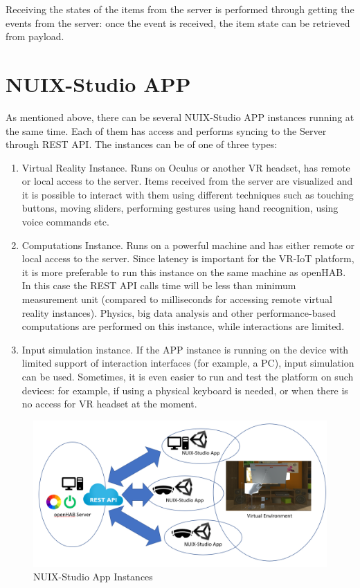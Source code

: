 Receiving the states of the items from the server is performed through getting the events from the server: once the event is received, the item state can be retrieved from payload.

\section{NUIX-Studio APP}

As mentioned above, there can be several NUIX-Studio APP instances running at the same time. Each of them has access and performs syncing to the Server through REST API. The instances can be of one of three types:

\begin{enumerate}
    \item Virtual Reality Instance. Runs on Oculus or another VR headset, has remote or local access to the server. Items received from the server are visualized and it is possible to interact with them using different techniques such as touching buttons, moving sliders, performing gestures using hand recognition, using voice commands etc. 
    \item Computations Instance. Runs on a powerful machine and has either remote or local access to the server. Since latency is important for the VR-IoT platform, it is more preferable to run this instance on the same machine as openHAB. In this case the REST API calls time will be less than minimum measurement unit (compared to milliseconds for accessing remote virtual reality instances). Physics, big data analysis and other performance-based computations are performed on this instance, while interactions are limited.
    \item Input simulation instance. If the APP instance is running on the device with limited support of interaction interfaces (for example, a PC), input simulation can be used. Sometimes, it is even easier to run and test the platform on such devices: for example, if using a physical keyboard is needed, or when there is no access for VR headset at the moment.
\end{enumerate}

\begin{figure}
  \centering
  \includegraphics[width=0.9\linewidth]{figures/AppInstances.png}
  \caption{NUIX-Studio App Instances}
  \label{fig:AppInstances-figure}
\end{figure}

